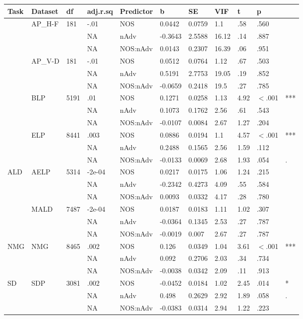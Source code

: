 \begin{table}[ht]
\centering
\begingroup\normalsize
\begin{tabular}{lllllllllll}
  \hline
Task & Dataset & df & adj.r.sq & Predictor & b & SE & VIF & t & p &  \\ 
  \hline
 & AP\_H-F & 181 & -.01 & NOS & 0.0442 & 0.0759 & 1.1 & .58 & .560 &   \\ 
   &  &  & NA & nAdv & -0.3643 & 2.5588 & 16.12 & .14 & .887 &   \\ 
   &  &  & NA & NOS:nAdv & 0.0143 & 0.2307 & 16.39 & .06 & .951 &   \\ 
   & AP\_V-D & 181 & -.01 & NOS & 0.0512 & 0.0764 & 1.12 & .67 & .503 &   \\ 
   &  &  & NA & nAdv & 0.5191 & 2.7753 & 19.05 & .19 & .852 &   \\ 
   &  &  & NA & NOS:nAdv & -0.0659 & 0.2418 & 19.5 & .27 & .785 &   \\ 
   & BLP & 5191 & .01 & NOS & 0.1271 & 0.0258 & 1.13 & 4.92 & $<$.001 & *** \\ 
   &  &  & NA & nAdv & 0.1073 & 0.1762 & 2.56 & .61 & .543 &   \\ 
   &  &  & NA & NOS:nAdv & -0.0107 & 0.0084 & 2.67 & 1.27 & .204 &   \\ 
   & ELP & 8441 & .003 & NOS & 0.0886 & 0.0194 & 1.1 & 4.57 & $<$.001 & *** \\ 
   &  &  & NA & nAdv & 0.2488 & 0.1565 & 2.56 & 1.59 & .112 &   \\ 
   &  &  & NA & NOS:nAdv & -0.0133 & 0.0069 & 2.68 & 1.93 & .054 & . \\ 
  ALD & AELP & 5314 & -2e-04 & NOS & 0.0217 & 0.0175 & 1.06 & 1.24 & .215 &   \\ 
   &  &  & NA & nAdv & -0.2342 & 0.4273 & 4.09 & .55 & .584 &   \\ 
   &  &  & NA & NOS:nAdv & 0.0093 & 0.0332 & 4.17 & .28 & .780 &   \\ 
   & MALD & 7487 & -2e-04 & NOS & 0.0187 & 0.0183 & 1.11 & 1.02 & .307 &   \\ 
   &  &  & NA & nAdv & -0.0364 & 0.1345 & 2.53 & .27 & .787 &   \\ 
   &  &  & NA & NOS:nAdv & -0.0019 & 0.007 & 2.67 & .27 & .787 &   \\ 
  NMG & NMG & 8465 & .002 & NOS & 0.126 & 0.0349 & 1.04 & 3.61 & $<$.001 & *** \\ 
   &  &  & NA & nAdv & 0.092 & 0.2706 & 2.03 & .34 & .734 &   \\ 
   &  &  & NA & NOS:nAdv & -0.0038 & 0.0342 & 2.09 & .11 & .913 &   \\ 
  SD & SDP & 3081 & .002 & NOS & -0.0452 & 0.0184 & 1.02 & 2.45 & .014 & * \\ 
   &  &  & NA & nAdv & 0.498 & 0.2629 & 2.92 & 1.89 & .058 & . \\ 
   &  &  & NA & NOS:nAdv & -0.0383 & 0.0314 & 2.94 & 1.22 & .223 &   \\ 
   \hline
\end{tabular}
\endgroup
\end{table}
